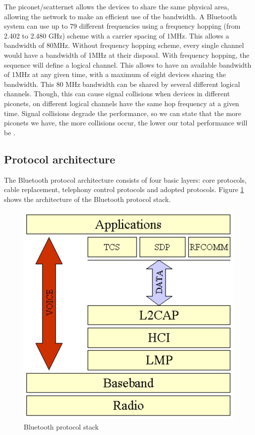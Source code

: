 \documentclass[a4paper, 11pt]{report}
\begin{document}
The piconet/scatternet allows the devices to share the same physical area, allowing the network to make an efficient use of the bandwidth. A Bluetooth system can use up to 79 different frequencies using a frequency hopping (from 2.402 to 2.480 GHz) \cite{bluetoothStack} scheme with a carrier spacing of 1MHz. This allows a bandwidth of 80MHz. Without frequency hopping scheme, every single channel would have a bandwidth of 1MHz at their disposal. With frequency hopping, the sequence will define a logical channel. This allows to have an available bandwidth of 1MHz at any given time, with a maximum of eight devices sharing the bandwidth. This 80 MHz bandwidth can be shared by several different logical channels. Though, this can cause signal collisions when devices in different piconets, on different logical channels have the same hop frequency at a given time. Signal collisions degrade the performance, so we can state that the more piconets we have, the more collisions occur, the lower our total performance will be \cite{introBluetooth}.

	\subsection{Protocol architecture}
The Bluetooth protocol architecture consists of four basic layers: core protocols, cable replacement, telephony control protocols and adopted protocols. Figure \ref{fig:bluetoothStack} shows the architecture of the Bluetooth protocol stack.
	\begin{figure}[ht]
		\centering
		\includegraphics[scale=0.5]{images/bluetoothStack.pdf}
		\caption{Bluetooth protocol stack}\label{fig:bluetoothStack}
	\end{figure}
\end{document}

